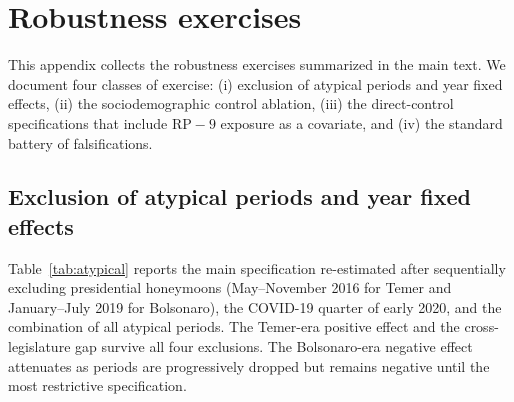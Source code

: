 \documentclass[preprint,12pt,authoryear]{elsarticle}
\begin{document}



\appendix
\renewcommand{\thesection}{\Alph{section}}
\renewcommand{\sectionautorefname}{Appendix}
\setcounter{section}{0}
\renewcommand{\thesection}{Appendix \Alph{section}}

\section{Robustness exercises}
\label{app:robustness}

This appendix collects the robustness exercises summarized in the main text. We document four classes of exercise: (i) exclusion of atypical periods and year fixed effects, (ii) the sociodemographic control ablation, (iii) the direct-control specifications that include $\mathrm{RP-9}$ exposure as a covariate, and (iv) the standard battery of falsifications.

\subsection{Exclusion of atypical periods and year fixed effects}
\label{appsub:atypical}

Table~\ref{tab:atypical} reports the main specification re-estimated after sequentially excluding presidential honeymoons (May--November 2016 for Temer and January--July 2019 for Bolsonaro), the COVID-19 quarter of early 2020, and the combination of all atypical periods. The Temer-era positive effect and the cross-legislature gap survive all four exclusions. The Bolsonaro-era negative effect attenuates as periods are progressively dropped but remains negative until the most restrictive specification.
\end{document}
